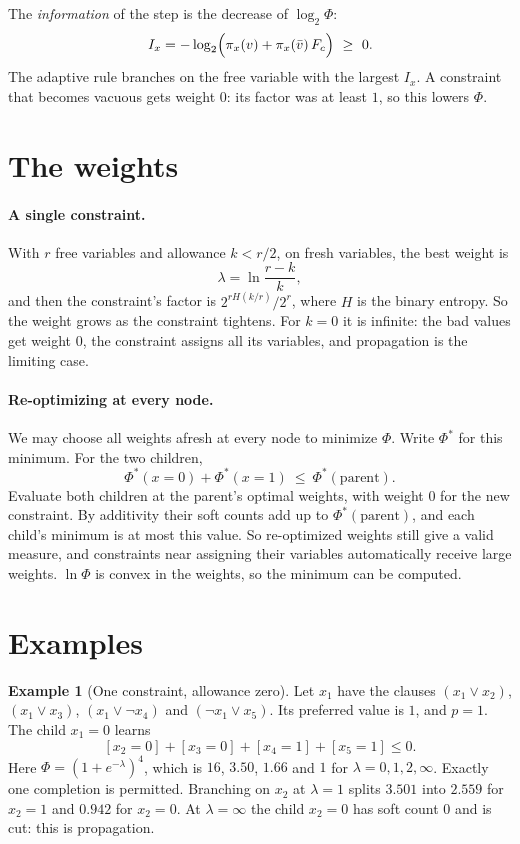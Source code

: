 \documentclass[11pt,a4paper]{article}
\theoremstyle{definition}
\newtheorem{example}[lemma]{Example}
\begin{document}
The \emph{information} of the step is the decrease of $\log_2\Phi$:
\[
 I_x=-\log_2\Bigl(\pi_x(v)+\pi_x(\bar v)\,F_c\Bigr)\ \ge\ 0 .
\]
The adaptive rule branches on the free variable with the largest $I_x$. A
constraint that becomes vacuous gets weight $0$: its factor was at least $1$,
so this lowers $\Phi$.

\section{The weights}

\paragraph{A single constraint.} With $r$ free variables and allowance
$k<r/2$, on fresh variables, the best weight is
\[
 \lambda=\ln\frac{r-k}{k},
\]
and then the constraint's factor is $2^{rH(k/r)}/2^r$, where $H$ is the binary
entropy. So the weight grows as the constraint tightens. For $k=0$ it is
infinite: the bad values get weight $0$, the constraint assigns all its
variables, and propagation is the limiting case.

\paragraph{Re-optimizing at every node.} We may choose all weights afresh at
every node to minimize $\Phi$. Write $\Phi^*$ for this minimum. For the two
children,
\[
 \Phi^*(x=0)+\Phi^*(x=1)\ \le\ \Phi^*(\text{parent}).
\]
Evaluate both children at the parent's optimal weights, with weight $0$ for
the new constraint. By additivity their soft counts add up to
$\Phi^*(\text{parent})$, and each child's minimum is at most this value. So
re-optimized weights still give a valid measure, and constraints near
assigning their variables automatically receive large weights.
$\ln\Phi$ is convex in the weights, so the minimum can be computed.

\section{Examples}

\begin{example}[One constraint, allowance zero]\label{ex:A}
Let $x_1$ have the clauses $(x_1\lor x_2)$, $(x_1\lor x_3)$,
$(x_1\lor\neg x_4)$ and $(\neg x_1\lor x_5)$. Its preferred value is $1$, and
$p=1$. The child $x_1=0$ learns
\[
 [x_2=0]+[x_3=0]+[x_4=1]+[x_5=1]\le0 .
\]
Here $\Phi=(1+e^{-\lambda})^4$, which is $16$, $3.50$, $1.66$ and $1$ for
$\lambda=0,1,2,\infty$. Exactly one completion is permitted. Branching on
$x_2$ at $\lambda=1$ splits $3.501$ into $2.559$ for $x_2=1$ and $0.942$ for
$x_2=0$. At $\lambda=\infty$ the child $x_2=0$ has soft count $0$ and is cut:
this is propagation.
\end{example}
\end{document}
